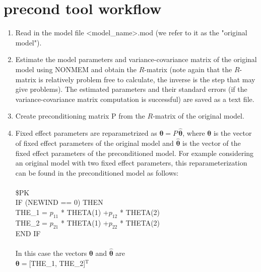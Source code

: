 \section{precond tool workflow}
\begin{enumerate}
    \item Read in the model file <model\_name>.mod (we refer to it as the "original model").
    \item Estimate the model parameters and variance-covariance matrix of the original model using NONMEM and obtain the $R$-matrix (note again that the $R$-matrix is relatively problem free to calculate, the inverse is the step that may give problems).  The estimated parameters and their standard errors (if the variance-covariance matrix computation is successful) are saved as a text file.
    \item Create preconditioning matrix P from the $R$-matrix of the original model.
    \item Fixed effect parameters are reparametrized as $\boldsymbol{\theta} = P \,\hat{\boldsymbol{\theta}}$, where $\boldsymbol{\theta}$ is the vector of fixed effect parameters of the original model and $\hat{\boldsymbol{\theta}}$ is the vector of the fixed effect parameters of the preconditioned model.
     For example considering an original model with two fixed effect parameters, this reparameterization can be found in the preconditioned model as follows:\\
\\
        \$PK\\
        IF (NEWIND == 0) THEN\\
        THE\_1 = $p_{11}$ * THETA(1) +$p_{12}$ * THETA(2)\\
        THE\_2 = $p_{21}$ * THETA(1) +$p_{22}$ * THETA(2)\\
        END IF\\
        \\
              In this case the vectors  ${\boldsymbol{\theta}}$ and $\hat{\boldsymbol{\theta}}$ are\\
        \indent $\boldsymbol{\theta}=$[THE\_1, THE\_2]$^\textrm{T}$\\

\end{enumerate}
